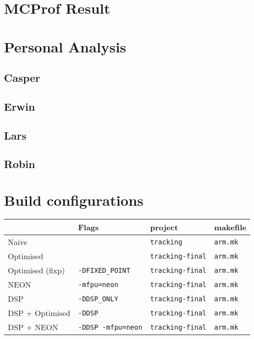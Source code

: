 \documentclass[final]{article} %
\begin{document}
\begin{appendices}

\section{MCProf Result}\label{app:appendix-mcprof-result}


\section{Personal Analysis}\label{app:appendix-personal-analysis}

\subsection{Casper}


\subsection{Erwin}


\subsection{Lars}


\subsection{Robin}

\section{Build configurations}
\begin{table}
	\centering
	\begin{tabular}{llll}
	\toprule
						& Flags						& project					& makefile			\\
	\midrule
	Naive				& \texttt{}					& \texttt{tracking}			& \texttt{arm.mk}	\\
	Optimised			& \texttt{}					& \texttt{tracking-final}	& \texttt{arm.mk}	\\
	Optimised (fixp)	& \texttt{-DFIXED\_POINT}	& \texttt{tracking-final}	& \texttt{arm.mk}	\\
	NEON				& \texttt{-mfpu=neon}		& \texttt{tracking-final}	& \texttt{arm.mk}	\\
	DSP					& \texttt{-DDSP\_ONLY}		& \texttt{tracking-final}	& \texttt{arm.mk}	\\
	DSP + Optimised		& \texttt{-DDSP}			& \texttt{tracking-final}	& \texttt{arm.mk}	\\
	DSP + NEON			& \texttt{-DDSP -mfpu=neon}	& \texttt{tracking-final}	& \texttt{arm.mk}	\\
	\bottomrule
	\end{tabular}
\end{table}


\end{appendices}
\end{document}
